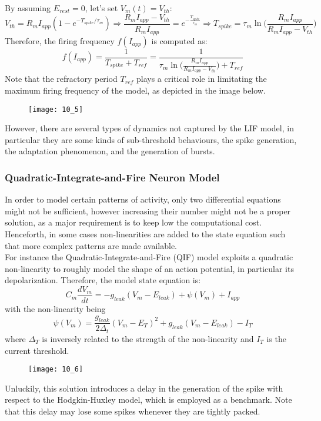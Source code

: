By assuming \(E_{rest}=0\), let's set \(V_{m}(t)=V_{th}\):
\begin{equation*}
    V_{th}=R_{m}I_{app}(1-e^{-T_{spike}/\tau_{m}})
    \Rightarrow
    \frac{R_{m}I_{app}-V_{th}}{R_{m}I_{app}}=e^{-\frac{T_{spike}}{\tau_{m}}}
    \Rightarrow
    T_{spike}=\tau_{m}\ln{\Biggl(\frac{R_{m}I_{app}}{R_{m}I_{app}-V_{th}}\Biggr)}
\end{equation*}
Therefore, the firing frequency \(f(I_{app})\) is computed as:
\begin{equation*}
    f(I_{app})=\frac{1}{T_{spike}+T_{ref}}=\frac{1}{\tau_{m}\ln{\Biggl(\frac{R_{m}I_{app}}{R_{m}I_{app}-V_{th}}\Biggr)}+T_{ref}}
\end{equation*}
Note that the refractory period \(T_{ref}\) plays a critical role in limitating the maximum firing frequency of the model,
as depicted in the image below.
\begin{figure}[H]
    \texttt{[image: 10\_5]}
    \centering
\end{figure}
However, there are several types of dynamics not captured by the LIF model, in particular they are some kinds of
sub-threshold behaviours, the spike generation, the adaptation phenomenon, and the generation of bursts.
\subsubsection{Quadratic-Integrate-and-Fire Neuron Model}
In order to model certain patterns of activity, only two differential equations might not be sufficient,
however increasing their number might not be a proper solution, as a major requirement is to keep
low the computational cost. Henceforth, in some cases non-linearities are added to the state
equation such that more complex patterns are made available.\\
For instance the Quadratic-Integrate-and-Fire (QIF) model exploits a quadratic non-linearity to roughly model
the shape of an action potential, in particular its depolarization. Therefore, the model state equation is:
\begin{equation*}
    C_{m}\frac{dV_{m}}{dt}=-g_{leak}(V_{m}-E_{leak})+\psi(V_{m})+I_{app}
\end{equation*}
with the non-linearity being
\begin{equation*}
    \psi(V_{m})=\frac{g_{leak}}{2\Delta_{t}}(V_{m}-E_{T})^{2}+g_{leak}(V_{m}-E_{leak})-I_{T}
\end{equation*}
where \(\Delta_{T}\) is inversely related to the strength of the non-linearity and \(I_{T}\) is the
current threshold.
\begin{figure}[H]
    \texttt{[image: 10\_6]}
    \centering
\end{figure}
Unluckily, this solution introduces a delay in the generation of the spike with respect to the Hodgkin-Huxley model,
which is employed as a benchmark. Note that this delay may lose some spikes whenever they are tightly packed.
